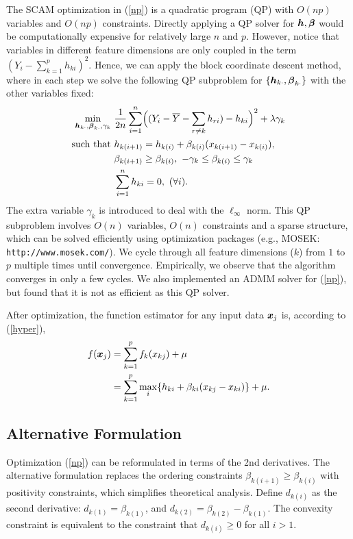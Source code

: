 The SCAM optimization in (\ref{np}) is a quadratic program (QP) with
$O(np)$ variables and $O(np)$ constraints. 
Directly applying a QP solver for $\boldsymbol{h},
\boldsymbol{\beta}$ would be computationally expensive for relatively large
$n$ and $p$. However, notice that variables in different feature
dimensions are only coupled in the term
$(Y_{i}-\sum_{k=1}^{p}h_{ki})^{2}$. Hence, we can apply the block
coordinate descent method, where in each step we solve the following
QP subproblem for $\{\boldsymbol{h}_{k\cdot},\boldsymbol{\beta}_{k\cdot}\}$ with the
other variables fixed:
\begin{equation}
\begin{split}\nonumber
       \min_{\bds{h}_{k\cdot},\bds{\beta}_{k\cdot},\gamma_{k}} &
             \ \frac{1}{2n}\sum_{i=1}^{n}\Bigl((Y_{i}-\bar{Y}-\sum_{r\neq{k}}h_{ri})-h_{ki}\Bigr)^{2} 
                      + \lambda\gamma_{k} \\
        \textrm{such that} & \ h_{k(i+1)} = h_{k(i)} + \beta_{k(i)}(x_{k(i+1)}-x_{k(i)}),\\
        &\ \beta_{k(i+1)} \geq \beta_{k(i)}, \ -\gamma_{k}\leq\beta_{k(i)}\leq\gamma_{k}\\
        &\  \sum_{i=1}^{n}h_{ki}=0, \ (\forall i).
\end{split}
\end{equation}
The extra variable $\gamma_{k}$ is introduced to deal with the $\ell_{\infty}$ norm. This QP subproblem involves $O(n)$ variables, $O(n)$ constraints and a sparse structure, 
which can be solved efficiently using optimization packages (e.g., MOSEK: \verb+http://www.mosek.com/+).  We cycle through all feature dimensions ($k$) from $1$ to $p$ multiple times until convergence.
Empirically, we observe that the algorithm converges in only a few cycles. We also implemented an ADMM solver for (\ref{np}), but found that it is not as efficient as this QP solver.

After optimization, the function estimator for any input data $\boldsymbol{x}_j$ is, according to (\ref{hyper}),
\begin{equation}
\begin{split}
\nonumber
      f(\boldsymbol{x}_j) & = \sum_{k=1}^{p}f_k(x_{kj})+\mu \\ 
    & = \sum_{k=1}^{p}\max_{i} \{h_{ki}+\beta_{ki}(x_{kj}-x_{ki})\} +
      \mu.
\end{split}
\end{equation} 


\subsection{Alternative Formulation}
Optimization (\ref{np}) can be reformulated in terms of the 2nd derivatives. The alternative formulation replaces the ordering
constraints $\beta_{k(i+1)} \geq \beta_{k(i)}$ with positivity
constraints, which simplifies theoretical analysis.
Define $d_{k(i)}$ as the second derivative:
$d_{k(1)} = \beta_{k(1)}$, and $d_{k(2)} =
\beta_{k(2)} - \beta_{k(1)}$. The convexity constraint is
equivalent to the constraint that $d_{k(i)} \geq 0$ for all $i >
1$.

